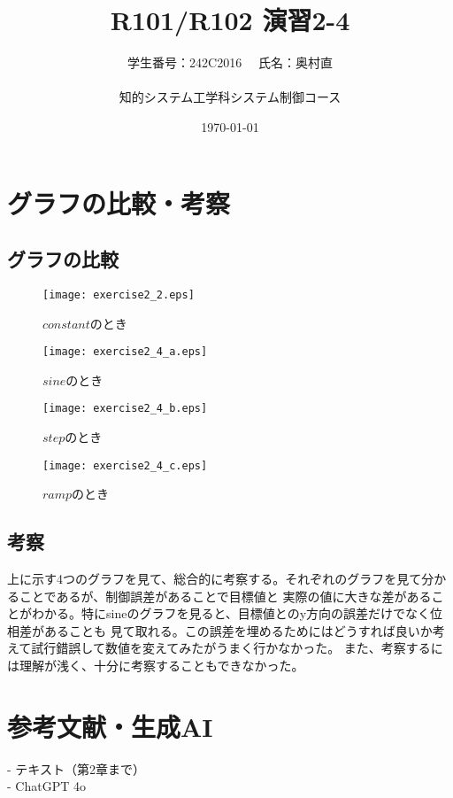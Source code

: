 \documentclass[10pt,a4paper,titlepage]{jreport} %
\title{R101/R102 演習2-4} %
\author{
  学生番号：242C2016 　氏名：奥村直 \\
  \\
  知的システム工学科システム制御コース
  } %
\date{\today} %
\begin{document}
\maketitle
\chapter{グラフの比較・考察}
\section{グラフの比較}
\begin{figure}[htbp]
  \centering
  \texttt{[image: exercise2\_2.eps]}
  \caption{$constant$のとき}
\end{figure}

\begin{figure}[htbp]
  \centering
  \texttt{[image: exercise2\_4\_a.eps]}
  \caption{$sine$のとき}
\end{figure}

\begin{figure}[htbp]
  \centering
  \texttt{[image: exercise2\_4\_b.eps]}
  \caption{$step$のとき}
\end{figure}

\begin{figure}[htbp]
  \centering
  \texttt{[image: exercise2\_4\_c.eps]}
  \caption{$ramp$のとき}
\end{figure}

\section{考察}
上に示す4つのグラフを見て、総合的に考察する。それぞれのグラフを見て分かることであるが、制御誤差があることで目標値と
実際の値に大きな差があることがわかる。特にsineのグラフを見ると、目標値とのy方向の誤差だけでなく位相差があることも
見て取れる。この誤差を埋めるためにはどうすれば良いか考えて試行錯誤して数値を変えてみたがうまく行かなかった。
また、考察するには理解が浅く、十分に考察することもできなかった。

\chapter{参考文献・生成AI}
- テキスト（第2章まで）\\
- ChatGPT 4o
\end{document}
